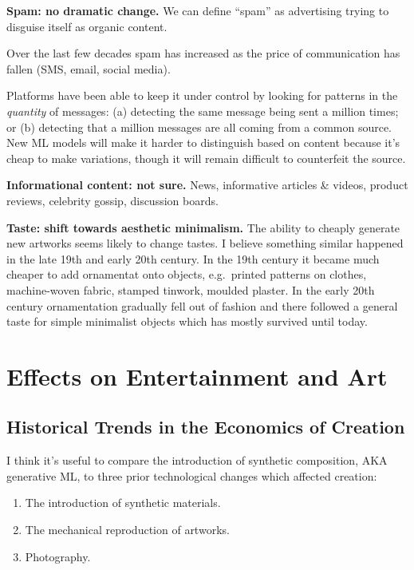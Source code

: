 \documentclass[
  11pt,
  letterpaper,
  DIV=11,
  numbers=noendperiod,
  oneside]{scrartcl}
\providecommand{\tightlist}{%
  \setlength{\itemsep}{0pt}\setlength{\parskip}{0pt}}\usepackage{longtable,booktabs,array}
\begin{document}
\textbf{Spam: no dramatic change.} We can define ``spam'' as advertising
trying to disguise itself as organic content.

Over the last few decades spam has increased as the price of
communication has fallen (SMS, email, social media).

Platforms have been able to keep it under control by looking for
patterns in the \emph{quantity} of messages: (a) detecting the same
message being sent a million times; or (b) detecting that a million
messages are all coming from a common source. New ML models will make it
harder to distinguish based on content because it's cheap to make
variations, though it will remain difficult to counterfeit the source.

\textbf{Informational content: not sure.} News, informative articles \&
videos, product reviews, celebrity gossip, discussion boards.

\textbf{Taste: shift towards aesthetic minimalism.} The ability to
cheaply generate new artworks seems likely to change tastes. I believe
something similar happened in the late 19th and early 20th century. In
the 19th century it became much cheaper to add ornamentat onto objects,
e.g.~printed patterns on clothes, machine-woven fabric, stamped tinwork,
moulded plaster. In the early 20th century ornamentation gradually fell
out of fashion and there followed a general taste for simple minimalist
objects which has mostly survived until today.

\hypertarget{effects-on-entertainment-and-art}{%
\section{Effects on Entertainment and
Art}\label{effects-on-entertainment-and-art}}

\hypertarget{historical-trends-in-the-economics-of-creation}{%
\subsection{Historical Trends in the Economics of
Creation}\label{historical-trends-in-the-economics-of-creation}}

I think it's useful to compare the introduction of synthetic
composition, AKA generative ML, to three prior technological changes
which affected creation:

\begin{enumerate}
\def\labelenumi{\arabic{enumi}.}
\tightlist
\item
  The introduction of synthetic materials.
\item
  The mechanical reproduction of artworks.
\item
  Photography.
\end{enumerate}
\end{document}
